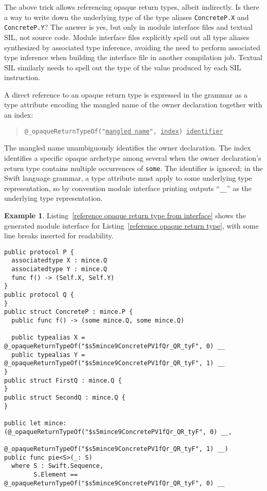 \documentclass[a4paper,headsepline,bibliography=totoc,toc=flat,fleqn,twoside=semi]{scrbook}
\theoremstyle{definition}
\theoremstyle{definition}
\newtheorem{example}{Example}[chapter]
\theoremstyle{definition}
\begin{document}
The above trick allows referencing opaque return types, albeit indirectly. Is there a way to write down the underlying type of the type aliases \texttt{ConcreteP.X} and \texttt{ConcreteP.Y}? The answer is yes, but only in module interface files and textual SIL, not source code. Module interface files explicitly spell out all type aliases synthesized by associated type inference, avoiding the need to perform associated type inference when building the interface file in another compilation job. Textual SIL similarly needs to spell out the type of the value produced by each SIL instruction.

A direct reference to an opaque return type is expressed in the grammar as a type attribute encoding the mangled name of the owner declaration together with an index:
\begin{quote}
\texttt{@\_opaqueReturnTypeOf("\underline{mangled name}", \underline{index}) \underline{identifier}}
\end{quote}
The mangled name unambiguously identifies the owner declaration. The index identifies a specific opaque archetype among several when the owner declaration's return type contains multiple occurrences of \texttt{some}. The identifier is ignored; in the Swift language grammar, a type attribute must apply to some underlying type representation, so by convention module interface printing outputs ``\texttt{\_\_}'' as the underlying type representation.

\begin{example}
Listing~\ref{reference opaque return type from interface} shows the generated module interface for Listing~\ref{reference opaque return type}, with some line breaks inserted for readability.
\begin{listing}\label{reference opaque return type from interface}
\begin{Verbatim}
public protocol P {
  associatedtype X : mince.Q
  associatedtype Y : mince.Q
  func f() -> (Self.X, Self.Y)
}
public protocol Q {
}
public struct ConcreteP : mince.P {
  public func f() -> (some mince.Q, some mince.Q)
  
  public typealias X = @_opaqueReturnTypeOf("$s5mince9ConcretePV1fQr_QR_tyF", 0) __
  public typealias Y = @_opaqueReturnTypeOf("$s5mince9ConcretePV1fQr_QR_tyF", 1) __
}
public struct FirstQ : mince.Q {
}
public struct SecondQ : mince.Q {
}

public let mince: (@_opaqueReturnTypeOf("$s5mince9ConcretePV1fQr_QR_tyF", 0) __,
                   @_opaqueReturnTypeOf("$s5mince9ConcretePV1fQr_QR_tyF", 1) __)
public func pie<S>(_: S)
  where S : Swift.Sequence,
        S.Element == @_opaqueReturnTypeOf("$s5mince9ConcretePV1fQr_QR_tyF", 0) __
\end{Verbatim}
\end{listing}
\end{example}
\end{document}
